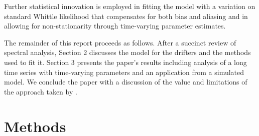 \documentclass{stat572Style}
\begin{document}
Further statistical innovation is employed in fitting the model with a variation on standard Whittle likelihood that compensates for both bias and aliasing and in allowing for non-stationarity through time-varying parameter estimates.
\par
The remainder of this report proceeds as follows.
 After a succinct review of spectral analysis, Section 2 discusses the model for the drifters and the methods used to fit it. 
 Section 3 presents the paper's results including analysis of a long time series with time-varying parameters and an application from a simulated model. 
We conclude the paper with a discussion of the value and limitations of the approach taken by \citet{Sykulski2016}. 






\section{Methods}
			
\end{document}
